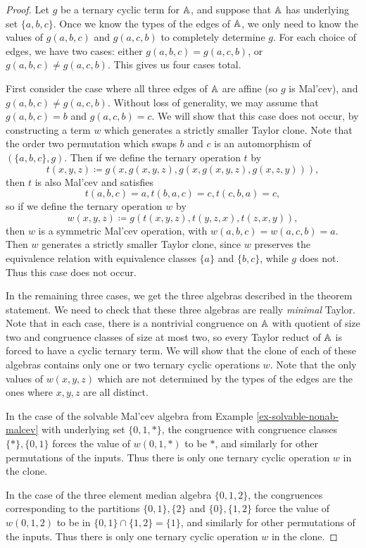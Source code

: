\documentclass[letterpaper,11pt]{article}
\begin{document}
\begin{proof} Let $g$ be a ternary cyclic term for $\mathbb{A}$, and suppose that $\mathbb{A}$ has underlying set $\{a,b,c\}$. Once we know the types of the edges of $\mathbb{A}$, we only need to know the values of $g(a,b,c)$ and $g(a,c,b)$ to completely determine $g$. For each choice of edges, we have two cases: either $g(a,b,c) = g(a,c,b)$, or $g(a,b,c) \ne g(a,c,b)$. This gives us four cases total.

First consider the case where all three edges of $\mathbb{A}$ are affine (so $g$ is Mal'cev), and $g(a,b,c) \ne g(a,c,b)$. Without loss of generality, we may assume that $g(a,b,c) = b$ and $g(a,c,b) = c$. We will show that this case does not occur, by constructing a term $w$ which generates a strictly smaller Taylor clone. Note that the order two permutation which swaps $b$ and $c$ is an automorphism of $(\{a,b,c\},g)$. Then if we define the ternary operation $t$ by
\[
t(x,y,z) \coloneqq g(x,g(x,y,z),g(x,g(x,y,z),g(x,z,y))),
\]
then $t$ is also Mal'cev and satisfies
\[
t(a,b,c) = a, t(b,a,c) = c, t(c,b,a) = c,
\]
so if we define the ternary operation $w$ by
\[
w(x,y,z) \coloneqq g(t(x,y,z),t(y,z,x),t(z,x,y)),
\]
then $w$ is a symmetric Mal'cev operation, with $w(a,b,c) = w(a,c,b) = a$. Then $w$ generates a strictly smaller Taylor clone, since $w$ preserves the equivalence relation with equivalence classes $\{a\}$ and $\{b,c\}$, while $g$ does not. Thus this case does not occur.

In the remaining three cases, we get the three algebras described in the theorem statement. We need to check that these three algebras are really \emph{minimal} Taylor. Note that in each case, there is a nontrivial congruence on $\mathbb{A}$ with quotient of size two and congruence classes of size at most two, so every Taylor reduct of $\mathbb{A}$ is forced to have a cyclic ternary term. We will show that the clone of each of these algebras contains only one or two ternary cyclic operations $w$. Note that the only values of $w(x,y,z)$ which are not determined by the types of the edges are the ones where $x,y,z$ are all distinct.

In the case of the solvable Mal'cev algebra from Example \ref{ex-solvable-nonab-malcev} with underlying set $\{0,1,*\}$, the congruence with congruence classes $\{*\}, \{0,1\}$ forces the value of $w(0,1,*)$ to be $*$, and similarly for other permutations of the inputs. Thus there is only one ternary cyclic operation $w$ in the clone.

In the case of the three element median algebra $\{0,1,2\}$, the congruences corresponding to the partitions $\{0,1\},\{2\}$ and $\{0\},\{1,2\}$ force the value of $w(0,1,2)$ to be in $\{0,1\} \cap \{1,2\} = \{1\}$, and similarly for other permutations of the inputs. Thus there is only one ternary cyclic operation $w$ in the clone.


\end{proof}
\end{document}
